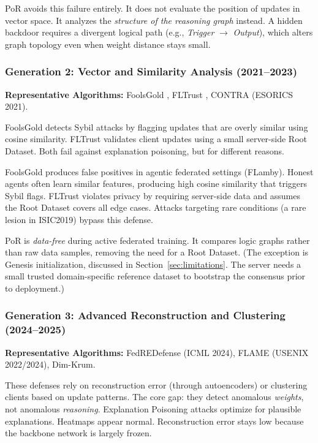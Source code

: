 \documentclass[journal]{IEEEtran}
\begin{document}
PoR avoids this failure entirely. It does not evaluate the position of updates in vector space. It analyzes the \emph{structure of the reasoning graph} instead. A hidden backdoor requires a divergent logical path (e.g., \textit{Trigger} $\rightarrow$ \textit{Output}), which alters graph topology even when weight distance stays small.

\subsubsection{Generation 2: Vector and Similarity Analysis (2021--2023)}

\textbf{Representative Algorithms:} FoolsGold \cite{fung2020}, FLTrust \cite{cao2021}, CONTRA (ESORICS 2021).

FoolsGold detects Sybil attacks by flagging updates that are overly similar using cosine similarity. FLTrust validates client updates using a small server-side Root Dataset. Both fail against explanation poisoning, but for different reasons.

FoolsGold produces false positives in agentic federated settings (FLamby). Honest agents often learn similar features, producing high cosine similarity that triggers Sybil flags. FLTrust violates privacy by requiring server-side data and assumes the Root Dataset covers all edge cases. Attacks targeting rare conditions (a rare lesion in ISIC2019) bypass this defense.

PoR is \emph{data-free} during active federated training. It compares logic graphs rather than raw data samples, removing the need for a Root Dataset. (The exception is Genesis initialization, discussed in Section~\ref{sec:limitations}. The server needs a small trusted domain-specific reference dataset to bootstrap the consensus prior to deployment.)

\subsubsection{Generation 3: Advanced Reconstruction and Clustering (2024--2025)}

\textbf{Representative Algorithms:} FedREDefense (ICML 2024), FLAME (USENIX 2022/2024), Dim-Krum.

These defenses rely on reconstruction error (through autoencoders) or clustering clients based on update patterns. The core gap: they detect anomalous \emph{weights}, not anomalous \emph{reasoning}. Explanation Poisoning attacks optimize for plausible explanations. Heatmaps appear normal. Reconstruction error stays low because the backbone network is largely frozen.
\end{document}
